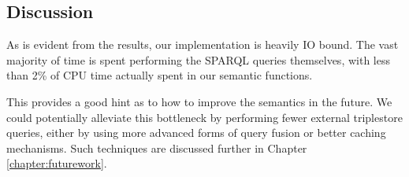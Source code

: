 \documentclass[../main.tex]{subfiles}
\begin{document}
\subsection{Discussion}

As is evident from the results, our implementation is heavily IO bound.
The vast majority of time is spent performing the SPARQL queries themselves, with
less than 2\% of CPU time actually spent in our semantic functions.

This provides a good hint as to how to improve the semantics in the future.
We could potentially alleviate this bottleneck by performing fewer external triplestore queries,
either by using more advanced forms of query fusion or better caching mechanisms.  Such techniques
are discussed further in Chapter \ref{chapter:futurework}.
\end{document}
